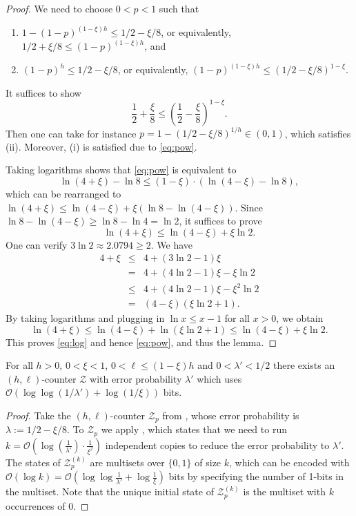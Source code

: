 \documentclass{article}\usepackage[a4paper,margin=20mm]{geometry}
\renewcommand{\O}{\mathcal{O}}
\newcommand{\BZ}{\mathcal{Z}}
\renewcommand{\geq}{\geqslant}
\renewcommand{\leq}{\leqslant}
\renewcommand{\ge}{\geq}
\renewcommand{\le}{\leq}
\begin{document}
\begin{proof}
We need to choose $0<p<1$ such that
\begin{enumerate}[label=(\roman*)]
\item $1-(1-p)^{(1-\xi) h} \le 1/2-\xi/8$, or equivalently, $1/2+\xi/8 \le (1-p)^{(1-\xi)h}$, and
\item $(1-p)^{h} \le 1/2-\xi/8$, or  equivalently, $(1-p)^{(1-\xi)h} \le (1/2-\xi/8)^{1-\xi}$.
\end{enumerate}
It suffices to show
\begin{equation}
\label{eq:pow}
\frac{1}{2}+\frac{\xi}{8} \le \left( \frac{1}{2}-\frac{\xi}{8} \right)^{1-\xi}.
\end{equation}
Then one can take for instance $p = 1-(1/2-\xi/8)^{1/h} \in (0,1)$, which satisfies (ii). Moreover, (i) is satisfied due to \eqref{eq:pow}.

Taking logarithms shows that \eqref{eq:pow} is equivalent to 
\[ 
\ln(4+\xi) - \ln 8 \le (1-\xi) \cdot (\ln(4-\xi) - \ln 8),\] 
which can be rearranged to $\ln(4+\xi) \le \ln(4-\xi) + \xi (\ln 8 - \ln(4-\xi))$. Since $\ln 8 - \ln(4-\xi) \ge \ln 8 - \ln 4 = \ln 2$, it suffices to prove
\begin{equation}
	\label{eq:log}
	\ln(4+\xi) \le \ln(4-\xi) + \xi \ln 2.
\end{equation}
One can verify $3\ln 2 \approx 2.0794 \ge 2$. We have
\begin{eqnarray*}
	4+\xi &\le& 4 + (3\ln 2 - 1) \xi \\
	&=& 4 + (4\ln 2 - 1) \xi - \xi \ln 2 \\
	&\le& 4 + (4\ln 2 - 1) \xi - \xi^2 \ln 2 \\
	&=& (4-\xi)(\xi \ln 2 + 1).
\end{eqnarray*}
By taking logarithms and plugging in $\ln x \le x-1$ for all $x > 0$, we obtain
\[
	\ln(4+\xi) \le \ln(4-\xi) + \ln(\xi \ln 2 + 1) \le \ln(4-\xi) + \xi \ln 2.
\]
This proves \eqref{eq:log} and hence \eqref{eq:pow}, and thus the lemma.
\end{proof}

\begin{proposition}
\label{prop:bernoulli}
For all $h>0$, $0 < \xi < 1$, $0 < \ell \le (1-\xi) h$ and $0 < \lambda' < 1/2$ 
there exists an $(h,\ell)$-counter $\BZ$ with error probability $\lambda'$
which uses $\O(\log \log (1/\lambda') + \log (1/\xi))$ bits.
\end{proposition}

\begin{proof}
Take the $(h,\ell)$-counter $\BZ_p$ from , whose error
probability is $\lambda := 1/2 - \xi/8$. To $\BZ_p$  we apply 
,
which states that we need to run $k = \O(\log (\frac{1}{\lambda'}) \cdot \frac{1}{\xi^2})$ independent copies
to reduce the error probability to $\lambda'$.
The states of $\BZ^{(k)}_p$ are multisets over $\{0,1\}$ of size $k$,
which can be encoded with $\O(\log k) = \O(\log \log \frac{1}{\lambda'} + \log \frac{1}{\xi})$ bits
by specifying the number of 1-bits in the multiset. Note that the unique initial state of $\BZ^{(k)}_p$
is the multiset with $k$ occurrences of $0$.
\end{proof}
\end{document}
